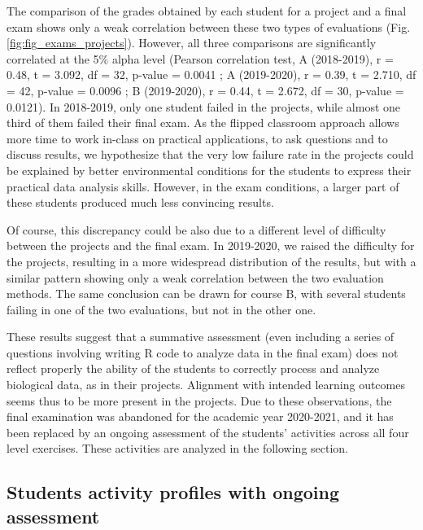 \documentclass{aims}
\theoremstyle{definition}
\begin{document}
The comparison of the grades obtained by each student for a project and
a final exam shows only a weak correlation between these two types of
evaluations (Fig. \ref {fig:fig_exams_projects}). However, all three
comparisons are significantly correlated at the 5\% alpha level (Pearson
correlation test, A (2018-2019), r = 0.48, t = 3.092, df = 32, p-value =
0.0041 ; A (2019-2020), r = 0.39, t = 2.710, df = 42, p-value = 0.0096 ;
B (2019-2020), r = 0.44, t = 2.672, df = 30, p-value = 0.0121). In
2018-2019, only one student failed in the projects, while almost one
third of them failed their final exam. As the flipped classroom approach
allows more time to work in-class on practical applications, to ask
questions and to discuss results, we hypothesize that the very low
failure rate in the projects could be explained by better environmental
conditions for the students to express their practical data analysis
skills. However, in the exam conditions, a larger part of these students
produced much less convincing results.

Of course, this discrepancy could be also due to a different level of
difficulty between the projects and the final exam. In 2019-2020, we
raised the difficulty for the projects, resulting in a more widespread
distribution of the results, but with a similar pattern showing only a
weak correlation between the two evaluation methods. The same conclusion
can be drawn for course B, with several students failing in one of the
two evaluations, but not in the other one.

These results suggest that a summative assessment (even including a
series of questions involving writing R code to analyze data in the
final exam) does not reflect properly the ability of the students to
correctly process and analyze biological data, as in their projects.
Alignment with intended learning outcomes seems thus to be more present
in the projects. Due to these observations, the final examination was
abandoned for the academic year 2020-2021, and it has been replaced by
an ongoing assessment of the students' activities across all four level
exercises. These activities are analyzed in the following section.

\hypertarget{students-activity-profiles-with-ongoing-assessment-1}{%
\subsection{Students activity profiles with ongoing
assessment}\label{students-activity-profiles-with-ongoing-assessment-1}}
\end{document}

